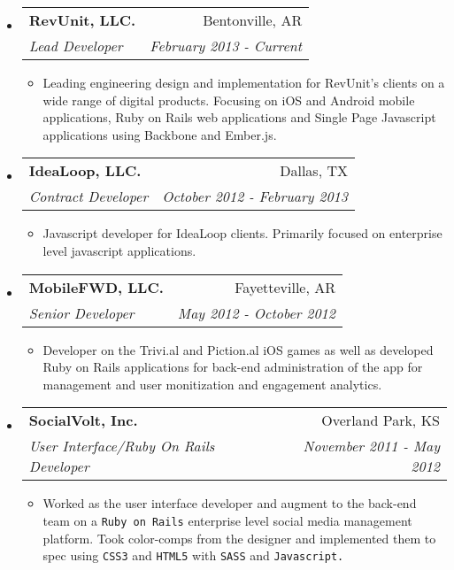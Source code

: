 \documentclass[letterpaper,13pt]{article}
\makeatletter
\newcommand{\resitem}[1]{\item #1 \vspace{-2pt}}
\newcommand{\ressubheading}[4]{

\begin{tabular*}{6.5in}{l@{\cftdotfill{\cftsecdotsep}\extracolsep{\fill}}r}

		\textbf{#1} & #2 \\

		\textit{#3} & \textit{#4} \\

\end{tabular*}\vspace{-4pt}}
\makeatother
\begin{document}
\begin{itemize}

\item

	\ressubheading{RevUnit, LLC.}{Bentonville, AR}{Lead Developer}{February 2013 - Current}

	\begin{itemize}

		\resitem{Leading engineering design and implementation for RevUnit's clients on a wide range of digital products. Focusing on iOS and Android mobile applications, Ruby on Rails web applications and Single Page Javascript applications using Backbone and Ember.js.}

	\end{itemize}

\item

	\ressubheading{IdeaLoop, LLC.}{Dallas, TX}{Contract Developer}{October 2012 - February 2013}

	\begin{itemize}

		\resitem{Javascript developer for IdeaLoop clients. Primarily focused on enterprise level javascript applications.}

	\end{itemize}

\item

	\ressubheading{MobileFWD, LLC.}{Fayetteville, AR}{Senior Developer}{May 2012 - October 2012}

	\begin{itemize}

		\resitem{Developer on the Trivi.al and Piction.al iOS games as well as developed Ruby on Rails applications for back-end administration of the app for management and user monitization and engagement analytics.}

	\end{itemize}
	
\item

	\ressubheading{SocialVolt, Inc.}{Overland Park, KS}{User Interface/Ruby On Rails Developer}{November 2011 - May 2012}

	\begin{itemize}

		\resitem{Worked as the user interface developer and augment to the back-end team on a \texttt{Ruby on Rails} enterprise level social media management platform. Took color-comps from the designer and implemented them to spec using \texttt{CSS3} and \texttt{HTML5} with \texttt{SASS} and \texttt{Javascript.}}


\end{itemize}
\end{itemize}
\end{document}
